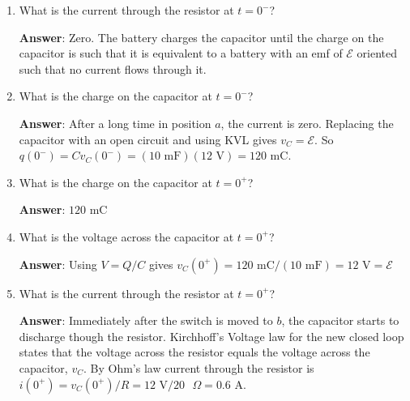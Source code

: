 \documentclass{article}
\begin{document}
\begin{enumerate}

  \item What is the current through the resistor at $t=0^-$?

        \ifsolutions
        \textbf{Answer}: Zero. The battery charges the capacitor until the charge on the capacitor is such that it is equivalent to a battery with an emf of $\mathcal{E}$ oriented such that no current flows through it.
        \else
        \vskip 56.25pt
        \fi
        \ifsolutions\else
        \vskip 56.25pt
        \fi

  \item What is the charge on the capacitor at $t=0^-$?

        \ifsolutions
        \textbf{Answer}: After a long time in position $a$, the current is zero. Replacing the capacitor with an open circuit and using KVL gives $v_C=\mathcal{E}$. So $q(0^-) = Cv_C(0^-) = (10 \text{ mF})(12\text{ V}) = 120\text{ mC}$.
        \else
        \vskip 56.25pt
        \fi
        \ifsolutions\else
        \vskip 56.25pt
        \fi

  \item What is the charge on the capacitor at $t=0^+$?

        \ifsolutions
        \textbf{Answer}: $120\text{ mC}$
        \else
        \vskip 56.25pt
        \fi
        \ifsolutions\else
        \vskip 56.25pt
        \fi

  \item What is the voltage across the capacitor at $t=0^+$?

        \ifsolutions
        \textbf{Answer}: Using $V=Q/C$ gives $v_C(0^+)=120\text{ mC}/(10\text{ mF}) = 12\text{ V} = \mathcal{E}$
        \else
        \vskip 56.25pt
        \fi
        \ifsolutions\else
        \vskip 56.25pt
        \fi

  \item What is the current through the resistor at $t=0^+$?

        \ifsolutions
        \textbf{Answer}: Immediately after the switch is moved to $b$, the capacitor starts to discharge though the resistor. Kirchhoff's Voltage law for the new closed loop states that the voltage across the resistor equals the voltage across the capacitor, $v_C$. By Ohm's law current through the resistor is $i(0^+) = v_C(0^+)/R = 12\text{ V}/20\text{ }\Omega = 0.6\text{ A}$.
        \else
        \vskip 56.25pt
        \fi
        \ifsolutions\else
        \vskip 56.25pt
        \fi


\end{enumerate}
\end{document}
